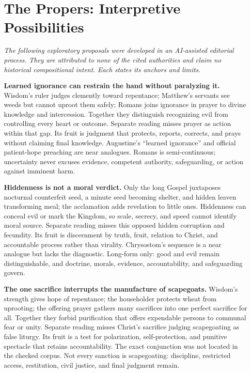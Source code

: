 \section*{The Propers: Interpretive Possibilities}

\noindent\emph{The following exploratory proposals were developed in an AI-assisted editorial process. They are attributed to none of the cited authorities and claim no historical compositional intent. Each states its anchors and limits.}

\noindent\textbf{Learned ignorance can restrain the hand without paralyzing it.\enspace{}}
Wisdom's ruler judges clemently toward repentance; Matthew's servants see weeds but cannot uproot them safely; Romans joins ignorance in prayer to divine knowledge and intercession. Together they distinguish recognizing evil from controlling every heart or outcome. Separate reading misses prayer as action within that gap. Its fruit is judgment that protects, reports, corrects, and prays without claiming final knowledge. Augustine's “learned ignorance” and official patient-hope preaching are near analogues. Romans is semi-continuous; uncertainty never excuses evidence, competent authority, safeguarding, or action against imminent harm.

\noindent\textbf{Hiddenness is not a moral verdict.\enspace{}}
Only the long Gospel juxtaposes nocturnal counterfeit seed, a minute seed becoming shelter, and hidden leaven transforming meal; the acclamation adds revelation to little ones. Hiddenness can conceal evil or mark the Kingdom, so scale, secrecy, and speed cannot identify moral source. Separate reading misses this opposed hidden corruption and fecundity. Its fruit is discernment by truth, fruit, relation to Christ, and accountable process rather than virality. Chrysostom's sequence is a near analogue but lacks the diagnostic. Long-form only: good and evil remain distinguishable, and doctrine, morals, evidence, accountability, and safeguarding govern.

\noindent\textbf{The one sacrifice interrupts the manufacture of scapegoats.\enspace{}}
Wisdom's strength gives hope of repentance; the householder protects wheat from uprooting; the offering prayer gathers many sacrifices into one perfect sacrifice for all. Together they forbid purification that offers expendable persons to communal fear or unity. Separate reading misses Christ's sacrifice judging scapegoating as false liturgy. Its fruit is a test for polarization, self-protection, and punitive spectacle that retains accountability. The exact conjunction was not located in the checked corpus. Not every sanction is scapegoating: discipline, restricted access, restitution, civil justice, and final judgment remain.

